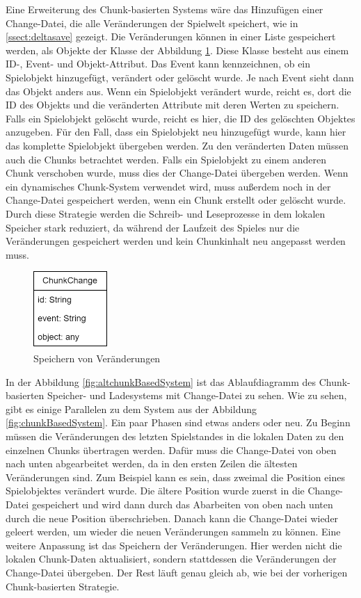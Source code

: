 Eine Erweiterung des Chunk-basierten Systems wäre das Hinzufügen einer Change-Datei, die alle Veränderungen der Spielwelt speichert, wie in \ref{ssect:deltasave} gezeigt. Die Veränderungen können in einer Liste gespeichert werden, als Objekte der Klasse der Abbildung \ref{fig:changesClass}. Diese Klasse besteht aus einem ID-, Event- und Objekt-Attribut. Das Event kann kennzeichnen, ob ein Spielobjekt hinzugefügt, verändert oder gelöscht wurde. Je nach Event sieht dann das Objekt anders aus. Wenn ein Spielobjekt verändert wurde, reicht es, dort die ID des Objekts und die veränderten Attribute mit deren Werten zu speichern. Falls ein Spielobjekt gelöscht wurde, reicht es hier, die ID des gelöschten Objektes anzugeben. Für den Fall, dass ein Spielobjekt neu hinzugefügt wurde, kann hier das komplette Spielobjekt übergeben werden. Zu den veränderten Daten müssen auch die Chunks betrachtet werden. Falls ein Spielobjekt zu einem anderen Chunk verschoben wurde, muss dies der Change-Datei übergeben werden. Wenn ein dynamisches Chunk-System verwendet wird, muss außerdem noch in der Change-Datei gespeichert werden, wenn ein Chunk erstellt oder gelöscht wurde. Durch diese Strategie werden die Schreib- und Leseprozesse in dem lokalen Speicher stark reduziert, da während der Laufzeit des Spieles nur die Veränderungen gespeichert werden und kein Chunkinhalt neu angepasst werden muss.

\begin{figure}[htp]
    \centering
    \includegraphics[width=0.25\textwidth]{images/Changes.png}
    \caption{Speichern von Veränderungen}
    \label{fig:changesClass}
\end{figure}

In der Abbildung \ref{fig:altchunkBasedSystem} ist das Ablaufdiagramm des Chunk-basierten Speicher- und Ladesystems mit Change-Datei zu sehen. Wie zu sehen, gibt es einige Parallelen zu dem System aus der Abbildung \ref{fig:chunkBasedSystem}. Ein paar Phasen sind etwas anders oder neu. Zu Beginn müssen die Veränderungen des letzten Spielstandes in die lokalen Daten zu den einzelnen Chunks übertragen werden. Dafür muss die Change-Datei von oben nach unten abgearbeitet werden, da in den ersten Zeilen die ältesten Veränderungen sind. Zum Beispiel kann es sein, dass zweimal die Position eines Spielobjektes verändert wurde. Die ältere Position wurde zuerst in die Change-Datei gespeichert und wird dann durch das Abarbeiten von oben nach unten durch die neue Position überschrieben. Danach kann die Change-Datei wieder geleert werden, um wieder die neuen Veränderungen sammeln zu können. Eine weitere Anpassung ist das Speichern der Veränderungen. Hier werden nicht die lokalen Chunk-Daten aktualisiert, sondern stattdessen die Veränderungen der Change-Datei übergeben. Der Rest läuft genau gleich ab, wie bei der vorherigen Chunk-basierten Strategie.

